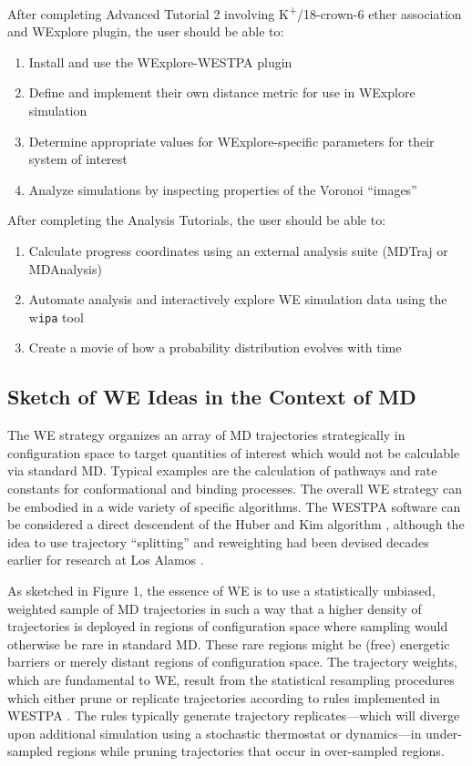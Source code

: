 \documentclass[9pt,tutorial]{livecoms}
\begin{document}
After completing Advanced Tutorial 2 involving K\textsuperscript{+}/18-crown-6 ether association and WExplore plugin, the user should be able to:
\begin{enumerate}
\item Install and use the WExplore-WESTPA plugin
\item Define and implement their own distance metric for use in WExplore simulation
\item Determine appropriate values for WExplore-specific parameters for their system of interest
\item Analyze simulations by inspecting properties of the Voronoi “images” 
\end{enumerate}

After completing the Analysis Tutorials, the user should be able to:
\begin{enumerate}
\item Calculate progress coordinates using an external analysis suite (MDTraj or MDAnalysis)
\item Automate analysis and interactively explore WE simulation data using the w\textunderscore \verb|ipa| tool
\item Create a movie of how a probability distribution evolves with time
\end{enumerate}

\subsection{Sketch of WE Ideas in the Context of MD}

The WE strategy organizes an array of MD trajectories strategically in configuration space to target quantities of interest which would not be calculable via standard MD. 
Typical examples are the calculation of pathways and rate constants for conformational and binding processes. 
The overall WE strategy can be embodied in a wide variety of specific algorithms. 
The WESTPA software can be considered a direct descendent of the Huber and Kim algorithm \citep{HuberKim1996}, although the idea to use trajectory “splitting” and reweighting had been devised decades earlier for research at Los Alamos \citep{KahnHarris1951}.  

As sketched in Figure 1, the essence of WE is to use a statistically unbiased, weighted sample of MD trajectories in such a way that a higher density of trajectories is deployed in regions of configuration space where sampling would otherwise be rare in standard MD. 
These rare regions might be (free) energetic barriers or merely distant regions of configuration space. 
The trajectory weights, which are fundamental to WE, result from the statistical resampling procedures which either prune or replicate trajectories according to rules implemented in WESTPA \citep{HuberKim1996,Zhang2010,Zwier2015}. 
The rules typically generate trajectory replicates---which will diverge upon additional simulation using a stochastic thermostat or dynamics---in under-sampled regions while pruning trajectories that occur in over-sampled regions.  
\end{document}
